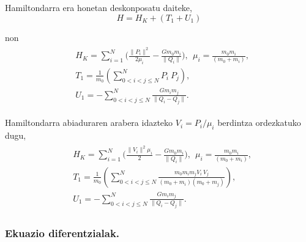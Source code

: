Hamiltondarra era honetan deskonposatu daiteke,
\begin{equation*}
H=H_K+(T_1+U_1)
\end{equation*}

non
\begin{align}
\begin{split}
&H_K=\sum\limits_{i=1}^{N}\bigg(\frac{\|P_i\|^2}{2 \mu_i} -\frac{G m_0 m_i}{\|Q_i\|}\bigg), \ \ \mu_i=\frac{m_0m_i}{(m_0+m_i)}, \\
&T_1=\frac{1}{m_0} \left(\sum\limits_{0<i<j\le N}^{N} P_i\ P_j \right),\\
&U_1= -\sum\limits_{0< i<j\le N}^{N} \frac{G m_i m_j}{\|Q_i-Q_j\|}.
\end{split}
\end{align}

Hamiltondarra abiaduraren arabera idazteko $V_i=P_i/\mu_i$ berdintza ordezkatuko dugu,
\begin{align}
\begin{split}
&H_K=\sum\limits_{i=1}^{N}\bigg(\frac{\|V_i\|^2 \mu_i}{2} -\frac{G m_0 m_i}{\|Q_i\|}\bigg), \ \ \mu_i=\frac{m_0m_i}{(m_0+m_i)}, \\
&T_1=\frac{1}{m_0} \left(\sum\limits_{0<i<j\le N}^{N} \frac{m_0 m_i m_j V_i\ V_j}{(m_0+m_i)(m_0+m_j)} \right),\\
&U_1= -\sum\limits_{0< i<j\le N}^{N} \frac{G m_i m_j}{\|Q_i-Q_j\|}.
\end{split}
\end{align}

\subsubsection*{Ekuazio diferentzialak.}

